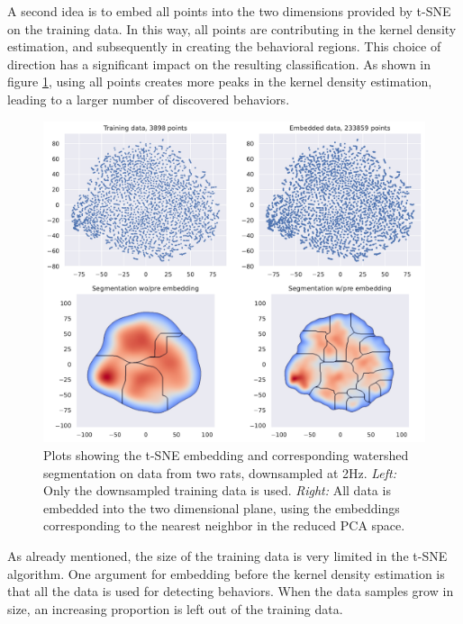 \documentclass[a4paper, 10pt]{memoir}
\theoremstyle{plain}
\theoremstyle{definition}
\theoremstyle{remark}
\begin{document}
A second idea is to embed all points into the two dimensions provided by t-SNE on the training data. 
In this way, all points are contributing in the kernel density estimation, and subsequently in creating the behavioral regions.
This choice of direction has a significant impact on the resulting classification.
As shown in figure \ref{fig:test_pre_embed}, using all points creates more peaks in the kernel density estimation, leading to a larger number of discovered behaviors.
\begin{figure}[tb]
        \centering
        \includegraphics[width=1\linewidth]{./code/figures/test_pre_embed.pdf}
        \caption{Plots showing the t-SNE embedding and corresponding watershed segmentation on data from two rats, downsampled at 2Hz.
        \textit{Left:} Only the downsampled training data is used.
\textit{Right:} All data is embedded into the two dimensional plane, using the embeddings corresponding to the nearest neighbor in the reduced PCA space.}
        \label{fig:test_pre_embed}
\end{figure}

As already mentioned, the size of the training data is very limited in the t-SNE algorithm.
One argument for embedding before the kernel density estimation is that all the data is used for detecting behaviors.
When the data samples grow in size, an increasing proportion is left out of the training data.
\end{document}
